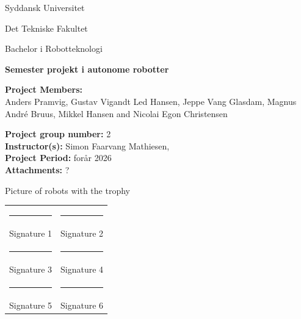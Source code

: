 \begin{titlepage}
    \centering
    \thispagestyle{empty}

    {\Large Syddansk Universitet \par}
    {\large Det Tekniske Fakultet \par}
    {\large Bachelor i Robotteknologi \par}

    \vspace{0.4 cm}

    {\huge \bfseries Semester projekt i autonome robotter \par}

    \vspace{0.8cm}

    \textbf{Project Members:}\\
    Anders Pramvig, Gustav Vigandt Led Hansen, Jeppe Vang Glasdam, Magnus André Bruus, Mikkel Hansen and Nicolai Egon Christensen  

    \vspace{0.4cm}

    \textbf{Project group number:} 2\\
    \vspace{0.4cm}
    \textbf{Instructor(s):} Simon Faarvang Mathiesen,\\
    \vspace{0.4cm}
    \textbf{Project Period:} forår 2026\\
    \vspace{0.4cm}
    \textbf{Attachments:} ?

    \vspace{0.5cm}
    
    {\small Picture of robots with the trophy}
    \vspace{0.5cm}

    \begin{center}
    \begin{tabular}{p{6cm} p{6cm}}
        \rule{6cm}{0.4pt} & \rule{6cm}{0.4pt} \\
        Signature 1 & Signature 2 \\[0.6cm]
        \rule{6cm}{0.4pt} & \rule{6cm}{0.4pt} \\
        Signature 3 & Signature 4 \\[0.6cm]
        \rule{6cm}{0.4pt} & \rule{6cm}{0.4pt} \\
        Signature 5 & Signature 6 \\[0.6cm]
    \end{tabular}
    \end{center}

\end{titlepage}